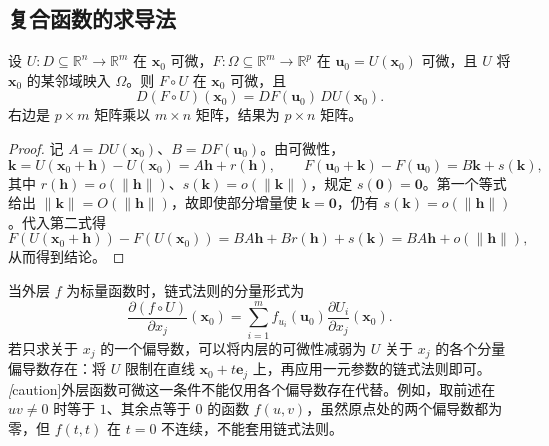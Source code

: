 \subsection{复合函数的求导法}
\label{subsec:multivariable-chain-rule}

\begin{theorem}[链式法则]
\label{thm:multivariable-chain-rule-ch14}
设 $U:D\subseteq\mathbb R^n\to\mathbb R^m$ 在 $\boldsymbol x_0$ 可微，$F:\Omega\subseteq\mathbb R^m\to\mathbb R^p$ 在 $\boldsymbol u_0=U(\boldsymbol x_0)$ 可微，且 $U$ 将 $\boldsymbol x_0$ 的某邻域映入 $\Omega$。则 $F\circ U$ 在 $\boldsymbol x_0$ 可微，且
\begin{equation}
\label{eq:multivariable-chain-rule-ch14}
    D(F\circ U)(\boldsymbol x_0)
    =DF(\boldsymbol u_0)\,DU(\boldsymbol x_0).
\end{equation}
右边是 $p\times m$ 矩阵乘以 $m\times n$ 矩阵，结果为 $p\times n$ 矩阵。
\end{theorem}
\begin{proof}
记 $A=DU(\boldsymbol x_0)$、$B=DF(\boldsymbol u_0)$。由可微性，
\[
    \boldsymbol k=U(\boldsymbol x_0+\boldsymbol h)-U(\boldsymbol x_0)
        =A\boldsymbol h+r(\boldsymbol h),\qquad
    F(\boldsymbol u_0+\boldsymbol k)-F(\boldsymbol u_0)
        =B\boldsymbol k+s(\boldsymbol k),
\]
其中 $r(\boldsymbol h)=o(\|\boldsymbol h\|)$、$s(\boldsymbol k)=o(\|\boldsymbol k\|)$，规定 $s(\boldsymbol0)=\boldsymbol0$。第一个等式给出 $\|\boldsymbol k\|=O(\|\boldsymbol h\|)$，故即使部分增量使 $\boldsymbol k=\boldsymbol0$，仍有 $s(\boldsymbol k)=o(\|\boldsymbol h\|)$。代入第二式得
\[
    F(U(\boldsymbol x_0+\boldsymbol h))-F(U(\boldsymbol x_0))
    =BA\boldsymbol h+Br(\boldsymbol h)+s(\boldsymbol k)
    =BA\boldsymbol h+o(\|\boldsymbol h\|),
\]
从而得到结论。
\end{proof}

当外层 $f$ 为标量函数时，链式法则的分量形式为
\begin{equation}
\label{eq:partial-chain-rule-ch14}
    \frac{\partial(f\circ U)}{\partial x_j}(\boldsymbol x_0)
    =\sum_{i=1}^m
        f_{u_i}(\boldsymbol u_0)\frac{\partial U_i}{\partial x_j}(\boldsymbol x_0).
\end{equation}
若只求关于 $x_j$ 的一个偏导数，可以将内层的可微性减弱为 $U$ 关于 $x_j$ 的各个分量偏导数存在：将 $U$ 限制在直线 $\boldsymbol x_0+t\boldsymbol e_j$ 上，再应用一元参数的链式法则即可。\emph[caution]{外层函数可微这一条件不能仅用各个偏导数存在代替。}例如，取前述在 $uv\ne0$ 时等于 $1$、其余点等于 $0$ 的函数 $f(u,v)$，虽然原点处的两个偏导数都为零，但 $f(t,t)$ 在 $t=0$ 不连续，不能套用链式法则。

